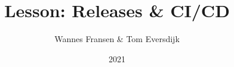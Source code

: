 \documentclass{beamer}
\title{Lesson: Releases \& CI/CD}
\author{Wannes Fransen \& Tom Eversdijk}
\institute{UC Leuven}
\date{2021}
\begin{document}
\frame{\titlepage}




\end{document}
